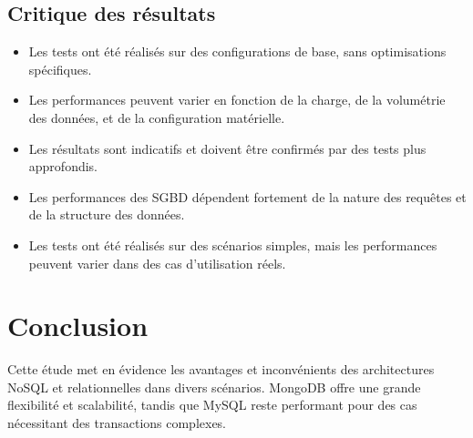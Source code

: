 \documentclass[a4paper,12pt]{report}
\begin{document}
\section{Critique des résultats}

\begin{itemize}
	\item Les tests ont été réalisés sur des configurations de base, sans optimisations spécifiques.
	\item Les performances peuvent varier en fonction de la charge, de la volumétrie des données, et de la configuration matérielle.
	\item Les résultats sont indicatifs et doivent être confirmés par des tests plus approfondis.
	\item Les performances des SGBD dépendent fortement de la nature des requêtes et de la structure des données.
	\item Les tests ont été réalisés sur des scénarios simples, mais les performances peuvent varier dans des cas d'utilisation réels.
\end{itemize}

\chapter{Conclusion}
Cette étude met en évidence les avantages et inconvénients des architectures NoSQL et relationnelles dans divers scénarios. MongoDB offre une grande flexibilité et scalabilité, tandis que MySQL reste performant pour des cas nécessitant des transactions complexes.
\end{document}
